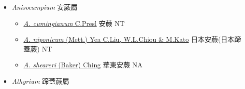 
  \begin{itemize}
 \item[] \textit{Anisocampium} 安蕨屬
                    
  \begin{itemize}
        \item[] \href{http://www.theplantlist.org/tpl1.1/search?q=Anisocampium+cumingianum}{\textit{A. cumingianum} C.Presl}   安蕨 NT
        \item[] \href{http://www.theplantlist.org/tpl1.1/search?q=Anisocampium+niponicum}{\textit{A. niponicum} (Mett.) Yea C.Liu, W.L.Chiou \& M.Kato}     日本安蕨(日本蹄蓋蕨)   NT
        \item[] \href{http://www.theplantlist.org/tpl1.1/search?q=Anisocampium+sheareri}{\textit{A. sheareri} (Baker) Ching}   華東安蕨 NA
  \end{itemize}
 \item[] \textit{Athyrium} 蹄蓋蕨屬
                    

\end{itemize}
